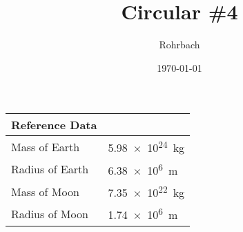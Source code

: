 \documentclass[10pt]{exam}
\title{Circular \#4}
\author{Rohrbach}
\date{\today}
\begin{document}
\maketitle

\newcommand{\printdata}{
  \begin{center}
    \begin{tabular}{ll}
      \hline
      Reference Data  & \\
      \hline
      Mass of Earth   & \SI{5.98e24}{\kilo\gram} \\
      Radius of Earth & \SI{6.38e6}{\meter}      \\
      Mass of Moon   & \SI{7.35e22}{\kilo\gram} \\
      Radius of Moon & \SI{1.74e6}{\meter}      \\
      \hline
    \end{tabular}
  \end{center}
}

\printdata
\end{document}
